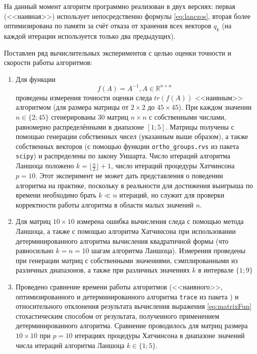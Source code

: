 На данный момент алгоритм программно реализован в двух версиях: первая (<<наивная>>) использует непосредственно формулы \eqref{eq:lanczos}, вторая более оптимизирована по памяти за счёт отказа от хранения всех векторов $ q_k $ (на каждой итерации используется только два предыдущих).

Поставлен ряд вычислительных экспериментов с целью оценки точности и скорости работы алгоритмов:

\begin{enumerate}
    \item Для функции
    \begin{equation}\label{eq:matrixFun}
        f(A) = A^{-1}, A \in \mathds{R}^{n \times n}
    \end{equation}
    проведены измерения точности оценки следа $tr(f(A))$ <<наивным>> алгоритмом (для размера матрицы от $ 2 \times 2 $ до $ 45 \times 45 $).
    При каждом значении $ n \in \{ 2;45 \} $ сгенерированы $ 30 $ матриц $ n \times n $ с собственными числами, равномерно распределёнными в диапазоне $ [1; 5] $.
    Матрицы получены с помощью генерации собственных чисел (указанным выше образом), а также собственных векторов (с помощью функции \texttt{ortho\_groups.rvs} \cite{mezzadri2007generate} из пакета \texttt{scipy}) и распределены по закону Уишарта.
    Число итераций алгоритма Ланшоца положено $ k = \lfloor \frac{n}{2} \rfloor + 1 $, число итераций процедуры Хатчинсона $ p = 10 $.
    Этот эксперимент не может дать представления о поведении алгоритма на практике, поскольку в реальности для достижения выигрыша по времени необходимо брать $ k \ll n $ итераций, но служит для проверки корректности работы алгоритма в области малых значений $ n $. %

    \item Для матриц $ 10 \times 10 $ измерена ошибка вычисления следа с помощью метода Ланшоца, а также с помощью алгоритма Хатчинсона при использовании детерминированного алгоритма вычисления квадратичной формы (что равносильно $k=n=10$ шагам алгоритма Ланшоца).
    Измерения проведены при генерации матриц с собственными значениями, сэмплированными из различных диапазонов, а также при различных значениях $ k $ в интервале $ \{ 1;9 \} $

    \item Проведено сравнение времени работы алгоритмов (<<наивного>>, оптимизированного и детерминированного алгоритма \texttt{trace} из пакета ) и относительного отклонения результата вычисления выражения \eqref{eq:matrixFun} стохастическим способом от результата, полученного применением детерминированного алгоритма.
    Сравнение проводилось для матриц размера $ 10 \times 10 $ при $ p = 10 $ итерациях процедуры Хатчинсона в диапазоне значений числа итераций алгоритма Ланшоца $ k \in \{1; 5\} $.

\end{enumerate}

